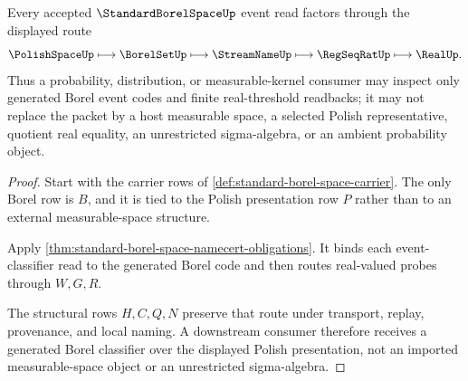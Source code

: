 \begin{theorem}
\label{thm:standard-borel-space-polish-borel-handoff}
Every accepted $\StandardBorelSpaceUp$ event read factors through the displayed route
$$
\PolishSpaceUp \longmapsto \BorelSetUp \longmapsto \StreamNameUp \longmapsto \RegSeqRatUp \longmapsto \RealUp.
$$
Thus a probability, distribution, or measurable-kernel consumer may inspect only generated Borel event codes and finite real-threshold readbacks; it may not replace the packet by a host measurable space, a selected Polish representative, quotient real equality, an unrestricted sigma-algebra, or an ambient probability object.
\end{theorem}
\begin{proof}
Start with the carrier rows of \autoref{def:standard-borel-space-carrier}. The only Borel row is $B$, and it is tied to the Polish presentation row $P$ rather than to an external measurable-space structure.

Apply \autoref{thm:standard-borel-space-namecert-obligations}. It binds each event-classifier read to the generated Borel code and then routes real-valued probes through $W,G,R$.

The structural rows $H,C,Q,N$ preserve that route under transport, replay, provenance, and local naming. A downstream consumer therefore receives a generated Borel classifier over the displayed Polish presentation, not an imported measurable-space object or an unrestricted sigma-algebra.
\end{proof}


\begin{closurestatus}{\StandardBorelSpaceUp}
  \theoryclosure{\seedClosure}
  \formalstatus{\formalTargetV}
\end{closurestatus}
